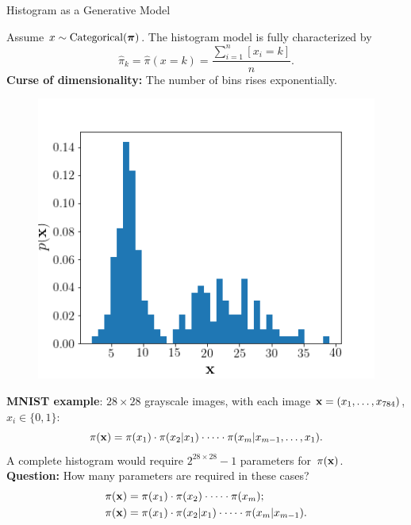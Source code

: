 \documentclass{beamer}
\begin{document}
\begin{frame}{Histogram as a Generative Model}
	
	\begin{minipage}[t]{0.6\columnwidth}
	    Assume $x \sim \mathrm{Categorical}(\boldsymbol{\pi})$. The histogram model is fully characterized by
		$$
		    \hat{\pi}_k = \hat{\pi}(x = k) = \frac{\sum_{i=1}^n [x_i = k]}{n}.
		$$
		\textbf{Curse of dimensionality:} The number of bins rises exponentially. \\
		\end{minipage}%
		\begin{minipage}[t]{0.4\columnwidth}
		\vspace{-0.5cm}
	    \begin{figure}[h]
	        \centering
	        \includegraphics[width=\linewidth]{figs/histogram.png}
	    \end{figure}
	\end{minipage}
	\textbf{MNIST example}: $28 \times 28$ grayscale images, with each image $\mathbf{x} = (x_1, \dots, x_{784})$, $x_i \in \{0, 1\}$:
	$$
	    \pi(\mathbf{x}) = \pi(x_1) \cdot \pi(x_2 | x_1) \cdot \dots \cdot \pi(x_m | x_{m-1}, \dots, x_1).
	$$
	A complete histogram would require $2^{28 \times 28} - 1$ parameters for~$\pi(\mathbf{x})$.\\
	\textbf{Question:} How many parameters are required in these cases?
	\begin{align*}
	    \pi(\mathbf{x}) &= \pi(x_1) \cdot \pi(x_2)\cdot \dots \cdot \pi(x_m); \\
	    \pi(\mathbf{x}) &= \pi(x_1) \cdot \pi(x_2 | x_1) \cdot \dots \cdot \pi(x_m | x_{m-1}).
	\end{align*}
\end{frame}
\end{document}
